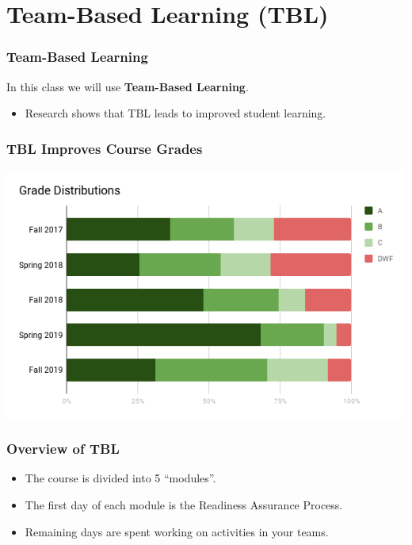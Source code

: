 \documentclass[aspectration=1610]{beamer}
\begin{document}
  \section{Team-Based Learning (TBL)}

  \begin{frame}\frametitle{Team-Based Learning}
  In this class we will use {\bf Team-Based Learning}.
  \begin{itemize}
    \item Research shows that TBL leads to improved student learning.
  \end{itemize}

\begin{center}
\end{center}  

  \end{frame}
  

  
  \begin{frame}\frametitle{TBL Improves Course Grades}
  
  \begin{center}
  \includegraphics[scale=0.5]{grades.png}
  \end{center}
  \end{frame}
  
  \begin{frame}\frametitle{Overview of TBL}
  \begin{itemize}
  \item The course is divided into 5 ``modules''.
  \item The first day of each module is the Readiness Assurance Process.
  \item Remaining days are spent working on activities in your teams.
  \end{itemize}
  \end{frame}
\end{document}
